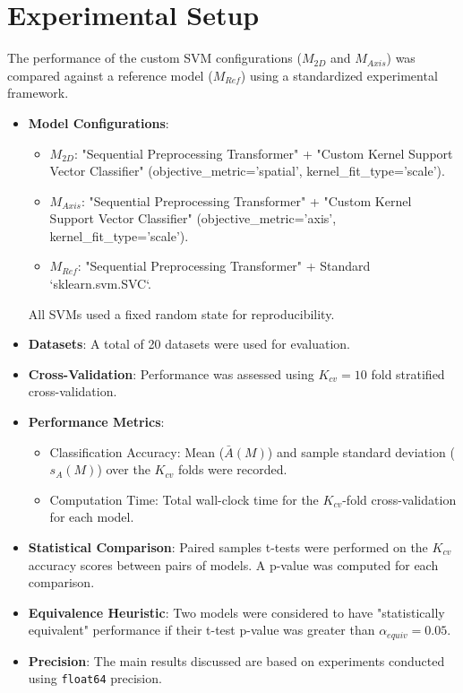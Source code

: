 \documentclass[conference]{IEEEtran} %
\begin{document}
\section{Experimental Setup}
The performance of the custom SVM configurations ($M_{2D}$ and $M_{Axis}$) was compared against a reference model ($M_{Ref}$) using a standardized experimental framework.
\begin{itemize}
    \item \textbf{Model Configurations}:
    \begin{itemize}
        \item $M_{2D}$: "Sequential Preprocessing Transformer" + "Custom Kernel Support Vector Classifier" (objective\_metric='spatial', kernel\_fit\_type='scale').
        \item $M_{Axis}$: "Sequential Preprocessing Transformer" + "Custom Kernel Support Vector Classifier" (objective\_metric='axis', kernel\_fit\_type='scale').
        \item $M_{Ref}$: "Sequential Preprocessing Transformer" + Standard `sklearn.svm.SVC`.
    \end{itemize}
    All SVMs used a fixed random state for reproducibility.
    \item \textbf{Datasets}: A total of 20 datasets were used for evaluation.
    \item \textbf{Cross-Validation}: Performance was assessed using $K_{cv}=10$ fold stratified cross-validation.
    \item \textbf{Performance Metrics}:
    \begin{itemize}
        \item Classification Accuracy: Mean ($\bar{A}(M)$) and sample standard deviation ($s_A(M)$) over the $K_{cv}$ folds were recorded.
        \item Computation Time: Total wall-clock time for the $K_{cv}$-fold cross-validation for each model.
    \end{itemize}
    \item \textbf{Statistical Comparison}: Paired samples t-tests were performed on the $K_{cv}$ accuracy scores between pairs of models. A p-value was computed for each comparison.
    \item \textbf{Equivalence Heuristic}: Two models were considered to have "statistically equivalent" performance if their t-test p-value was greater than $\alpha_{equiv}=0.05$.
    \item \textbf{Precision}: The main results discussed are based on experiments conducted using \texttt{float64} precision.
\end{itemize}
\end{document}
